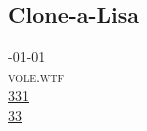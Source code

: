 \documentclass[10pt,a4paper]{article}
\begin{document}
\subsection{Clone-a-Lisa}
\noindent\begin{minipage}[t]{0.20\linewidth}
\vspace{0pt}
\noindent\textsc{\footnotesize
{\scriptsize\faCalendar}-01-01 \\
{\scriptsize\faGlobe}\space 
vole.wtf \\
{\scriptsize\faThumbsOUp}\space 
\href{http://news.ycombinator.com/item?id=37192710\&utm\_term=comment}{331} \\
{\scriptsize\faComments}\space 
\href{http://news.ycombinator.com/item?id=37192710\&utm\_term=comment}{33} \\
}
\end{minipage} 
\end{document}
